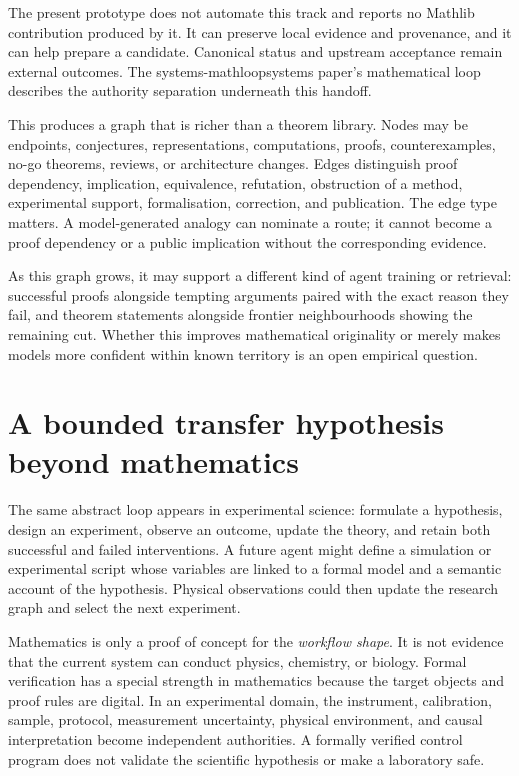 \documentclass[10pt]{article}
\begin{document}
The present prototype does not automate this track and reports no Mathlib
contribution produced by it.  It can preserve local evidence and provenance,
and it can help prepare a candidate.  Canonical status and upstream acceptance
remain external outcomes.  The
%
{systems-mathloop}{systems paper's mathematical loop} describes the authority
separation underneath this handoff.

This produces a graph that is richer than a theorem library.  Nodes may be
endpoints, conjectures, representations, computations, proofs,
counterexamples, no-go theorems, reviews, or architecture changes.  Edges
distinguish proof dependency, implication, equivalence, refutation,
obstruction of a method, experimental support, formalisation, correction, and
publication.  The edge type matters.  A model-generated analogy can nominate
a route; it cannot become a proof dependency or a public implication without
the corresponding evidence.

As this graph grows, it may support a different kind of agent training or
retrieval: successful proofs alongside tempting arguments paired with the
exact reason they fail, and theorem statements alongside frontier
neighbourhoods showing the remaining cut.  Whether this improves
mathematical originality or merely makes models more confident within known
territory is an open empirical question.

\section{A bounded transfer hypothesis beyond mathematics}\label{sec:science}

The same abstract loop appears in experimental science: formulate a
hypothesis, design an experiment, observe an outcome, update the theory, and
retain both successful and failed interventions.  A future agent might define
a simulation or experimental script whose variables are linked to a formal
model and a semantic account of the hypothesis.  Physical observations could
then update the research graph and select the next experiment.

Mathematics is only a proof of concept for the \emph{workflow shape}.  It is
not evidence that the current system can conduct physics, chemistry, or
biology.  Formal verification has a special strength in mathematics because
the target objects and proof rules are digital.  In an experimental domain,
the instrument, calibration, sample, protocol, measurement uncertainty,
physical environment, and causal interpretation become independent
authorities.  A formally verified control program does not validate the
scientific hypothesis or make a laboratory safe.
\end{document}
